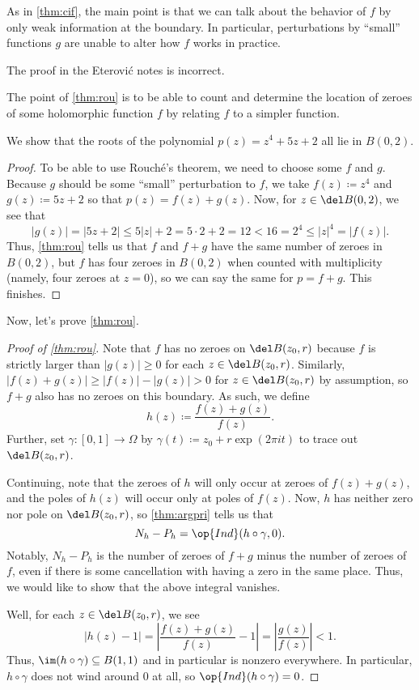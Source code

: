 \documentclass[../notes.tex]{subfiles}
\begin{document}
\begin{remark}
	As in \autoref{thm:cif}, the main point is that we can talk about the behavior of $f$ by only weak information at the boundary. In particular, perturbations by ``small'' functions $g$ are unable to alter how $f$ works in practice.
\end{remark}
\begin{warn}
	The proof in the Eterovi\'c notes is incorrect.
\end{warn}
The point of \autoref{thm:rou} is to be able to count and determine the location of zeroes of some holomorphic function $f$ by relating $f$ to a simpler function.
\begin{exe}
	We show that the roots of the polynomial $p(z)=z^4+5z+2$ all lie in $B(0,2)$.
\end{exe}
\begin{proof}
	To be able to use Rouch\'e's theorem, we need to choose some $f$ and $g$. Because $g$ should be some ``small'' perturbation to $f$, we take $f(z)\coloneqq z^4$ and $g(z)\coloneqq 5z+2$ so that $p(z)=f(z)+g(z)$. Now, for $z\in\del B(0,2)$, we see that
	\[|g(z)|=|5z+2|\le5|z|+2=5\cdot2+2=12<16=2^4\le|z|^4=|f(z)|.\]
	Thus, \autoref{thm:rou} tells us that $f$ and $f+g$ have the same number of zeroes in $B(0,2)$, but $f$ has four zeroes in $B(0,2)$ when counted with multiplicity (namely, four zeroes at $z=0$), so we can say the same for $p=f+g$. This finishes.
\end{proof}
Now, let's prove \autoref{thm:rou}.
\begin{proof}[Proof of \autoref{thm:rou}]
	Note that $f$ has no zeroes on $\del B(z_0,r)$ because $f$ is strictly larger than $|g(z)|\ge0$ for each $z\in\del B(z_0,r)$. Similarly, $|f(z)+g(z)|\ge|f(z)|-|g(z)|>0$ for $z\in \del B(z_0,r)$ by assumption, so $f+g$ also has no zeroes on this boundary. As such, we define
	\[h(z)\coloneqq \frac{f(z)+g(z)}{f(z)}.\]
	Further, set $\gamma\colon [0,1]\to\Omega$ by $\gamma(t)\coloneqq z_0+r\exp(2\pi it)$ to trace out $\del B(z_0,r)$.

	Continuing, note that the zeroes of $h$ will only occur at zeroes of $f(z)+g(z)$, and the poles of $h(z)$ will occur only at poles of $f(z)$. Now, $h$ has neither zero nor pole on $\del B(z_0,r)$, so \autoref{thm:argpri} tells us that
	\[N_h-P_h=\op{Ind}(h\circ\gamma,0).\]
	Notably, $N_h-P_h$ is the number of zeroes of $f+g$ minus the number of zeroes of $f$, even if there is some cancellation with having a zero in the same place. Thus, we would like to show that the above integral vanishes.

	Well, for each $z\in\del B(z_0,r)$, we see
	\[|h(z)-1|=\left|\frac{f(z)+g(z)}{f(z)}-1\right|=\left|\frac{g(z)}{f(z)}\right|<1.\]
	Thus, $\im(h\circ\gamma)\subseteq B(1,1)$ and in particular is nonzero everywhere. In particular, $h\circ\gamma$ does not wind around $0$ at all, so $\op{Ind}(h\circ\gamma)=0$.
\end{proof}
\end{document}
